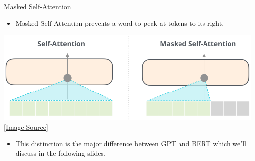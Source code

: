 \begin{frame}[fragile]{Masked Self-Attention}

    \begin{itemize}
        \item Masked Self-Attention prevents a word to peak at tokens to its right.
    \end{itemize}

    \begin{center}
        \includegraphics[scale=0.3]{../images/img_11.png} \\
        \href{https://jalammar.github.io/illustrated-gpt2/}{[Image Source]}
    \end{center}

    \begin{itemize}
        \item This distinction is the major difference between GPT and BERT which we'll discuss in the following slides.
    \end{itemize}

\end{frame}